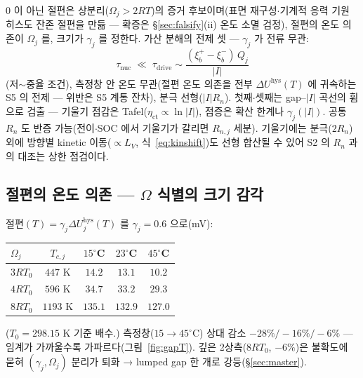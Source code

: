 \documentclass[11pt,a4paper]{article}
\newcommand{\hys}{\mathrm{hys}}
\begin{document}
$0$ 이 아닌 절편은 상분리($\Omega_j>2RT$)의 증거 후보이며(표면 재구성$\cdot$기계적 응력 기원 히스도 잔존 절편을 만듦 — 확증은 \S\ref{sec:falsify}(ii) 온도 소멸 검정), 절편의 온도 의존이 $\Omega_j$ 를, 크기가 $\gamma_j$ 를 정한다. 가산 분해의 전제 셋 — $\gamma_j$ 가 전류 무관:
\begin{equation*}
\tau_{\mathrm{nuc}}\;\ll\;\tau_{\mathrm{drive}}
\sim\frac{(\xi_b^+-\xi_b^-)\,Q_j}{|I|}
\end{equation*}
(저$\sim$중율 조건), 측정창 안 온도 무관(절편 온도 의존을 전부 $\Delta U^\hys(T)$ 에 귀속하는 S5 의 전제 — 위반은 S5 계통 잔차), 분극 선형($|I|R_n$). 첫째$\cdot$셋째는 gap--$|I|$ 곡선의 휨으로 검출 — 기울기 점감은 Tafel($\eta_{\mathrm{ct}}\propto\ln|I|$), 점증은 확산 한계나 $\gamma_j(|I|)$. 공통 $R_n$ 도 반증 가능(전이$\cdot$SOC 에서 기울기가 갈리면 $R_{n,j}$ 세분). 기울기에는 분극($2R_n$) 외에 방향별 kinetic 이동($\propto L_V$, 식~\eqref{eq:kinshift})도 선형 합산될 수 있어 S2 의 $R_n$ 과의 대조는 상한 점검이다.

\subsection{절편의 온도 의존 — $\Omega$ 식별의 크기 감각}
절편$(T)=\gamma_j\Delta U_j^\hys(T)$ 를 $\gamma_j=0.6$ 으로(mV):
\begin{center}
\renewcommand{\arraystretch}{1.25}
\begin{tabular}{lcccc}
\toprule
$\Omega_j$ & $T_{c,j}$ & $15^\circ$C & $23^\circ$C & $45^\circ$C \\
\midrule
$3RT_0$ & $447$ K & $14.2$ & $13.1$ & $10.2$ \\
$4RT_0$ & $596$ K & $34.7$ & $33.2$ & $29.3$ \\
$8RT_0$ & $1193$ K & $135.1$ & $132.9$ & $127.0$ \\
\bottomrule
\end{tabular}
\end{center}
($T_0=298.15$ K 기준 배수.) 측정창($15\to45^\circ$C) 상대 감소 $-28\%/-16\%/-6\%$ — 임계가 가까울수록 가파르다(그림~\ref{fig:gapT}). 깊은 2상측($8RT_0$, $-6\%$)은 불확도에 묻혀 $(\gamma_j,\Omega_j)$ 분리가 퇴화 → lumped gap 한 개로 강등(\S\ref{sec:master}).
\end{document}
